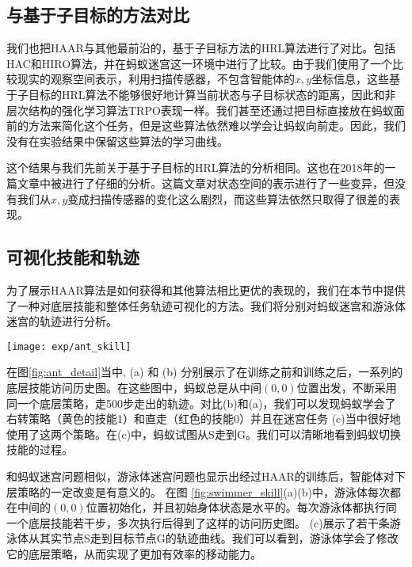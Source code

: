 \subsection{与基于子目标的方法对比} 

我们也把HAAR与其他最前沿的，基于子目标方法的HRL算法进行了对比。包括HAC和HIRO算法，并在蚂蚁迷宫这一环境中进行了比较。由于我们使用了一个比较现实的观察空间表示，利用扫描传感器，不包含智能体的$x, y$坐标信息，这些基于子目标的HRL算法不能够很好地计算当前状态与子目标状态的距离，因此和非层次结构的强化学习算法TRPO表现一样。我们甚至还通过把目标直接放在蚂蚁面前的方法来简化这个任务，但是这些算法依然难以学会让蚂蚁向前走。因此，我们没有在实验结果中保留这些算法的学习曲线。

这个结果与我们先前关于基于子目标的HRL算法的分析相同。这也在2018年的一篇文章\cite{sensitive_to_goal_space}中被进行了仔细的分析。这篇文章对状态空间的表示进行了一些变异，但没有我们从$x, y$变成扫描传感器的变化这么剧烈，而这些算法依然只取得了很差的表现。

\subsection{可视化技能和轨迹}
\label{deeper}

为了展示HAAR算法是如何获得和其他算法相比更优的表现的，我们在本节中提供了一种对底层技能和整体任务轨迹可视化的方法。我们将分别对蚂蚁迷宫和游泳体迷宫的轨迹进行分析。

\begin{figure*}[htbp]
\centering
 \centering
    \texttt{[image: exp/ant\_skill]}
\caption{(a) 蚂蚁预训练底层技能的访问历史图。 (b) 蚂蚁在蚂蚁迷宫环境中训练过后的底层技能访问历史图。 (c) 训练过后，蚂蚁在蚂蚁迷宫环境中的两条示例轨迹。}
\label{fig:ant_detail}
\end{figure*}

在图\ref{fig:ant_detail}当中, (a) 和 (b) 分别展示了在训练之前和训练之后，一系列的底层技能访问历史图。在这些图中，蚂蚁总是从中间$(0, 0)$位置出发，不断采用同一个底层策略，走500步走出的轨迹。对比(b)和(a)，我们可以发现蚂蚁学会了右转策略（黄色的技能1）和直走（红色的技能0）并且在迷宫任务 (c)当中很好地使用了这两个策略。在(c)中，蚂蚁试图从S走到G。我们可以清晰地看到蚂蚁切换技能的过程。

和蚂蚁迷宫问题相似，游泳体迷宫问题也显示出经过HAAR的训练后，智能体对下层策略的一定改变是有意义的。
在图 \ref{fig:swimmer_skill}(a)(b)中，游泳体每次都在中间的$(0, 0)$位置初始化，并且初始身体状态是水平的。每次游泳体都执行同一个底层技能若干步，多次执行后得到了这样的访问历史图。 (c)展示了若干条游泳体从其实节点S走到目标节点G的轨迹曲线。我们可以看到，游泳体学会了修改它的底层策略，从而实现了更加有效率的移动能力。

